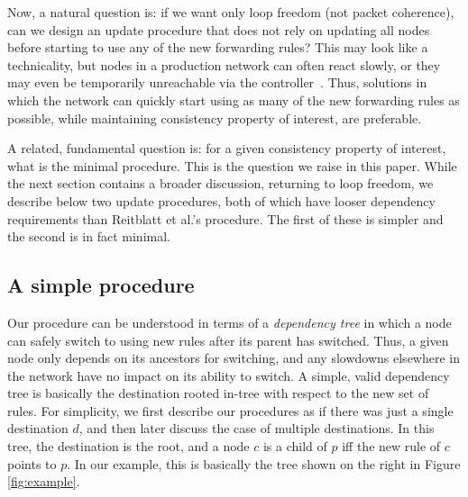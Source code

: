 Now, a natural question is: if we want only loop freedom (not packet coherence), can we design an update procedure that does not rely on updating all nodes before starting to use any of the new forwarding rules?  This may look like a technicality, but nodes in a production network can often react slowly, or they may even be temporarily unreachable via the controller~\cite{b4}.  Thus, solutions in which the network can quickly start using as many of the new forwarding rules as possible, while maintaining consistency property of interest, are preferable.

A related, fundamental question is: for a given consistency property of interest, what is the minimal procedure. This is the question we raise in this paper. While the next section contains a broader discussion, returning to loop freedom, we describe below two update procedures, both of which have looser dependency requirements than Reitblatt et al.'s procedure.  The first of these is simpler and the second is in fact minimal.



\subsection{A simple procedure}


Our procedure can be understood in terms of a {\em dependency tree} in which a node can safely switch to using new rules after its parent has switched. Thus, a given node only depends on its ancestors for switching, and any slowdowns elsewhere in the network have no impact on its ability to switch. A simple, valid dependency tree is basically the destination rooted in-tree with respect to the new set of rules. For simplicity, we first describe our procedures as if there was just a single destination $d$, and then later discuss the case of multiple destinations. In this tree, the destination is the root, and a node $c$ is a child of $p$ iff the new rule of $c$ points to $p$. In our example, this is basically the tree shown on the right in Figure \ref{fig:example}.

